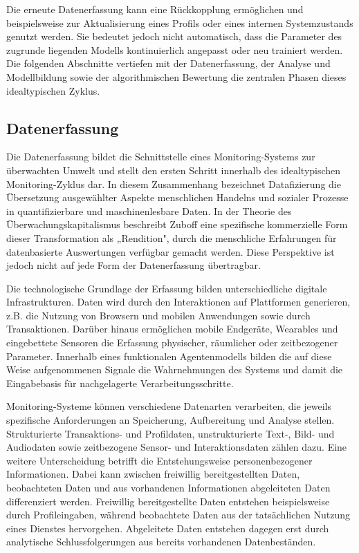 Die erneute Datenerfassung kann eine Rückkopplung ermöglichen und beispielsweise zur Aktualisierung eines Profils oder eines internen Systemzustands genutzt werden. Sie bedeutet jedoch nicht automatisch, dass die Parameter des zugrunde liegenden Modells kontinuierlich angepasst oder neu trainiert werden. Die folgenden Abschnitte vertiefen mit der Datenerfassung, der Analyse und Modellbildung sowie der algorithmischen Bewertung die zentralen Phasen dieses idealtypischen Zyklus.

\subsection{Datenerfassung}

Die Datenerfassung bildet die Schnittstelle eines Monitoring-Systems zur überwachten Umwelt und stellt den ersten Schritt innerhalb des idealtypischen Monitoring-Zyklus dar. In diesem Zusammenhang bezeichnet Datafizierung die Übersetzung ausgewählter Aspekte menschlichen Handelns und sozialer Prozesse in quantifizierbare und maschinenlesbare Daten. In der Theorie des Überwachungskapitalismus beschreibt Zuboff eine spezifische kommerzielle Form dieser Transformation als „Rendition", durch die menschliche Erfahrungen für datenbasierte Auswertungen verfügbar gemacht werden. Diese Perspektive ist jedoch nicht auf jede Form der Datenerfassung übertragbar.

Die technologische Grundlage der Erfassung bilden unterschiedliche digitale Infrastrukturen. Daten wird durch den Interaktionen auf Plattformen generieren, z.B. die Nutzung von Browsern und mobilen Anwendungen sowie durch Transaktionen. Darüber hinaus ermöglichen mobile Endgeräte, Wearables und eingebettete Sensoren die Erfassung physischer, räumlicher oder zeitbezogener Parameter. Innerhalb eines funktionalen Agentenmodells bilden die auf diese Weise aufgenommenen Signale die Wahrnehmungen des Systems und damit die Eingabebasis für nachgelagerte Verarbeitungsschritte.

Monitoring-Systeme können verschiedene Datenarten verarbeiten, die jeweils spezifische Anforderungen an Speicherung, Aufbereitung und Analyse stellen. Strukturierte Transaktions- und Profildaten, unstrukturierte Text-, Bild- und Audiodaten sowie zeitbezogene Sensor- und Interaktionsdaten zählen dazu. Eine weitere Unterscheidung betrifft die Entstehungsweise personenbezogener Informationen. Dabei kann zwischen freiwillig bereitgestellten Daten, beobachteten Daten und aus vorhandenen Informationen abgeleiteten Daten differenziert werden. Freiwillig bereitgestellte Daten entstehen beispielsweise durch Profileingaben, während beobachtete Daten aus der tatsächlichen Nutzung eines Dienstes hervorgehen. Abgeleitete Daten entstehen dagegen erst durch analytische Schlussfolgerungen aus bereits vorhandenen Datenbeständen.

